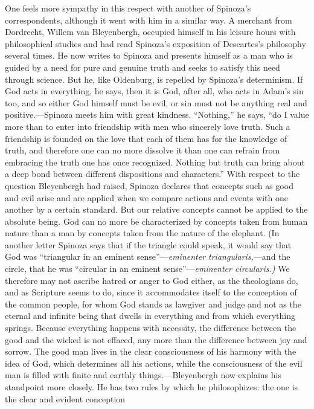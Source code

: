 \documentclass[12pt]{book}
\newcommand{\opage}[1]{\marginnote{\footnotesize\textit{[#1]}}}
\begin{document}
One feels more sympathy in this respect with another of Spinoza's correspondents,
although it went with him in a similar way. A merchant from Dordrecht, Willem van
Bleyenbergh, occupied himself in his leisure hours with philosophical studies and had
read Spinoza's exposition of Descartes's philosophy several times. He now writes to
Spinoza and presents himself as a man who is guided by a need for pure and genuine
truth and seeks \opage{51}to satisfy this need through science. But he, like Oldenburg,
is repelled by Spinoza's determinism. If God acts in everything, he says, then it is
God, after all, who acts in Adam's sin too, and so either God himself must be evil, or
sin must not be anything real and positive.---Spinoza meets him with great kindness.
``Nothing,'' he says, ``do I value more than to enter into friendship with men who
sincerely love truth. Such a friendship is founded on the love that each of them has
for the knowledge of truth, and therefore one can no more dissolve it than one can
refrain from embracing the truth one has once recognized. Nothing but truth can bring
about a deep bond between different dispositions and characters.'' With respect to the
question Bleyenbergh had raised, Spinoza declares that concepts such as good and evil
arise and are applied when we compare actions and events with one another by a certain
standard. But our relative concepts cannot be applied to the absolute being. God can no
more be characterized by concepts taken from human nature than a man by concepts taken
from the nature of the elephant. (In another letter Spinoza says that if the triangle
could speak, it would say that God was ``triangular in an eminent sense''---\textit{eminenter
triangularis,}---and the circle, that he was ``circular in an eminent sense''---\textit{eminenter
circularis.)} We therefore may not ascribe hatred or anger to God either, as the
theologians do, and as Scripture seems to do, since it accommodates itself to the
conception of the common people, for whom God stands as lawgiver and judge \opage{52}and
not as the eternal and infinite being that dwells in everything and from which
everything springs. Because everything happens with necessity, the difference between
the good and the wicked is not effaced, any more than the difference between joy and
sorrow. The good man lives in the clear consciousness of his harmony with the idea of
God, which determines all his actions, while the consciousness of the evil man is filled
with finite and earthly things.---Bleyenbergh now explains his standpoint more closely.
He has two rules by which he philosophizes: the one is the clear and evident conception
\end{document}
